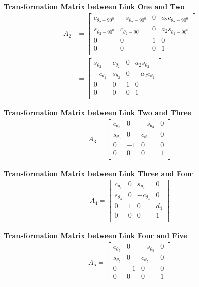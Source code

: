 \documentclass[12pt,a4paper]{article}
\begin{document}
	\textbf{Transformation Matrix between Link One and Two}
	\begin{align*}
	A_2&= \begin{bmatrix}
		 c_{\theta_2 - 90^0} & -s_{\theta_2 - 90^0} & 0 & a_2c_{\theta_2 - 90^0}\\
		 s_{\theta_2 - 90^0} & c_{\theta_2 - 90^0} & 0 & a_2s_{\theta_2 - 90^0}\\
		 0 & 0 & 1 & 0\\
		 0 & 0 & 0 & 1\\
		\end{bmatrix}\\
		&=\begin{bmatrix}
		 s_{\theta_2} & c_{\theta_2} & 0 & a_2s_{\theta_2}\\
		 -c_{\theta_2} & s_{\theta_2} & 0 & -a_2c_{\theta_2}\\
		 0 & 0 & 1 & 0\\
		 0 & 0 & 0 & 1\\
		\end{bmatrix}
	\end{align*}
	
	\textbf{Transformation Matrix between Link Two and Three}
	\begin{align*}
	A_3= \begin{bmatrix}
		 c_{\theta_3} & 0 & -s_{\theta_3} & 0\\
		 s_{\theta_3} & 0 & c_{\theta_3} & 0\\
		 0 & -1 & 0 & 0\\
		 0 & 0 & 0 & 1\\
		\end{bmatrix}
	\end{align*}
	
	\textbf{Transformation Matrix between Link Three and Four}
	\begin{align*}
	A_4= \begin{bmatrix}
		 c_{\theta_4} & 0 & s_{\theta_4} & 0\\
		 s_{\theta_4} & 0 & -c_{\theta_4} & 0\\
		 0 & 1 & 0 & d_4\\
		 0 & 0 & 0 & 1\\
		\end{bmatrix}
	\end{align*}
	
	\textbf{Transformation Matrix between Link Four and Five}
	\begin{align*}
	A_5= \begin{bmatrix}
		 c_{\theta_5} & 0 & -s_{\theta_5} & 0\\
		 s_{\theta_5} & 0 & c_{\theta_5} & 0\\
		 0 & -1 & 0 & 0\\
		 0 & 0 & 0 & 1\\
		\end{bmatrix}
	\end{align*}
	
\end{document}
